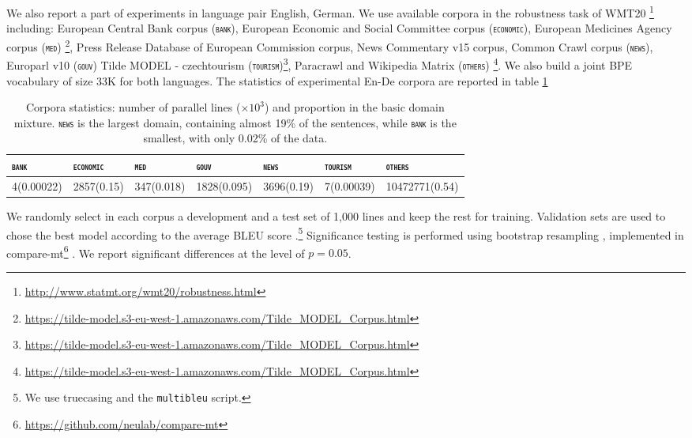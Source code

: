 \documentclass[11pt,a4paper]{article}
\newcommand{\fyDone}[1]{\done[FY]\Todo[FY:]{\textcolor{orange}{#1}}}
\newcommand{\domain}[1]{\texttt{\textsc{#1}}}
\begin{document}
We also report a part of experiments in language pair English, German. We use available corpora in the robustness task of WMT20 \footnote{\url{http://www.statmt.org/wmt20/robustness.html}} including: European Central Bank corpus (\domain{bank}),  European Economic and Social Committee corpus (\domain{economic}), European Medicines Agency corpus (\domain{med}) \footnote{\url{https://tilde-model.s3-eu-west-1.amazonaws.com/Tilde_MODEL_Corpus.html}}, Press Release Database of European Commission corpus, News Commentary v15 corpus, Common Crawl corpus (\domain{news}), Europarl v10 (\domain{gouv}) Tilde MODEL - czechtourism (\domain{tourism})\footnote{\url{https://tilde-model.s3-eu-west-1.amazonaws.com/Tilde_MODEL_Corpus.html}}, Paracrawl and Wikipedia Matrix (\domain{others}) \footnote{\url{https://tilde-model.s3-eu-west-1.amazonaws.com/Tilde_MODEL_Corpus.html}}. We also build a joint BPE vocabulary of size 33K for both languages. The statistics of experimental En-De corpora are reported in table \ref{tab:Corpora-en-de}

\begin{table}[htbp]
  \centering
  \begin{tabular}{ |lllllll|} %
    \hline
    \domain{bank} & \domain{economic} & \domain{med} & \domain{gouv} & \domain{news} & \domain{tourism} & \domain{others} \\
    \hline
    4(0.00022) & 2857(0.15) & 347(0.018) & 1828(0.095) & 3696(0.19) & 7(0.00039) & 10472771(0.54) \\
    \hline
  \end{tabular}
\caption{Corpora statistics: number of parallel lines ($\times 10^3$) and proportion in the basic domain mixture. \domain{news} is the largest domain, containing almost 19\% of the sentences, while \domain{bank} is the smallest, with only 0.02\% of the data.}
\label{tab:Corpora-en-de}
\end{table}

We randomly select in each corpus a development and a test set of 1,000 lines and keep the rest for training. Validation sets are used to chose the best model according to the average BLEU score \cite{Papineni02bleu}.\footnote{We use truecasing and the \texttt{multibleu} script.}\fyDone{A word about meta-parameter settings} Significance testing is performed using bootstrap resampling \cite{Koehn04statistical}, implemented in compare-mt\footnote{\url{https://github.com/neulab/compare-mt}} \cite{Neubig19compare-mt}. We report significant differences at the level of $p=0.05$.\fyDone{Fix correct p value}
\end{document}
